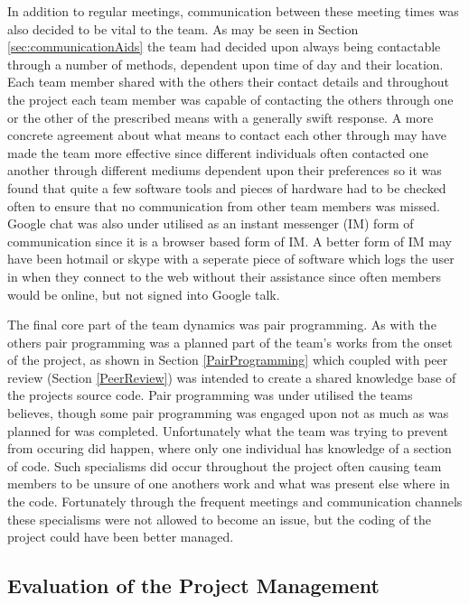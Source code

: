 In addition to regular meetings, communication between these meeting times was
also decided to be vital to the team. As may be seen in Section
\ref{sec:communicationAids} the team had decided upon always being contactable
through a number of methods, dependent upon time of day and their location. Each
team member shared with the others their contact details and throughout the
project each team member was capable of contacting the others through one or the
other of the prescribed means with a generally swift response. A more concrete
agreement about what means to contact each other through may have made the team
more effective since different individuals often contacted one another through
different mediums dependent upon their preferences so it was found that quite a
few software tools and pieces of hardware had to be checked often to ensure that
no communication from other team members was missed. Google chat was also under
utilised as an instant messenger (IM) form of communication since it is a
browser based form of IM. A better form of IM may have been hotmail or skype
with a seperate piece of software which logs the user in when they connect to
the web without their assistance since often members would be online, but not
signed into Google talk.

The final core part of the team dynamics was pair programming. As with the
others pair programming was a planned part of the team's works from the onset of
the project, as shown in Section \ref{PairProgramming} which coupled with peer
review (Section \ref{PeerReview}) was intended to create a shared knowledge base
of the projects source code. Pair programming was under utilised the teams
believes, though some pair programming was engaged upon not as much as was
planned for was completed. Unfortunately what the team was trying to prevent
from occuring did happen, where only one individual has knowledge of a section
of code. Such specialisms did occur throughout the project often causing team
members to be unsure of one anothers work and what was present else where in the
code. Fortunately through the frequent meetings and communication channels these
specialisms were not allowed to become an issue, but the coding of the project
could have been better managed.

\newpage
\subsection{Evaluation of the Project Management}

